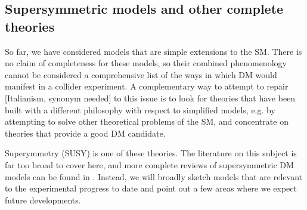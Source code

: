 \subsection{Supersymmetric models and other complete theories}
\label{sec:SUSYModels}

So far, we have considered models that are simple extensions to the SM. There is no claim of completeness for these models,
so their combined phenomenology cannot be considered a comprehensive list of the ways in which DM would manifest in a collider experiment.
A complementary way to attempt to repair [Italianism, synonym needed] to this issue is to look for theories that have been built with
a different philosophy with respect to simplified models, e.g. by attempting to solve other theoretical problems of the SM, 
and concentrate on theories that provide a good DM candidate. 

Superymmetry (SUSY) is one of these theories.
The literature on this subject is far too broad to cover here, and more complete reviews of supersymmetric DM models can
be found in \cite{Feng:2010gw,Ellis:2010kf}. Instead, we will broadly sketch models that are relevant to
the experimental progress to date and point out a few areas where we expect future developments. 

